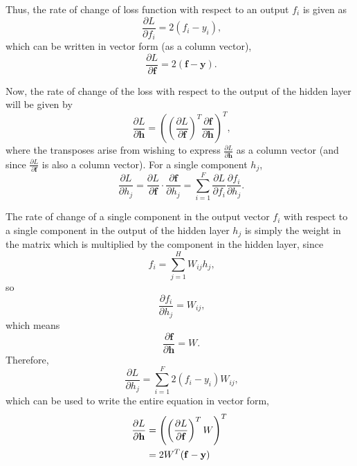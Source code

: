 \documentclass{article}
\begin{document}
Thus, the rate of change of loss function with respect to an output $f_i$ is given as
\begin{equation}
    \phantom{,}\frac{\partial L}{\partial f_i} = 2(f_i - y_i),
\end{equation}
which can be written in vector form (as a column vector),
\begin{equation}
    \phantom{.}\frac{\partial L}{\partial \mathbf{f}} = 2(\mathbf{f} - \mathbf{y}).
\end{equation}

Now, the rate of change of the loss with respect to the output of the hidden layer will be given by
\begin{equation}
    \phantom{,}\frac{\partial L}{\partial \mathbf{h}} = \left(\left(\frac{\partial L}{\partial \mathbf{f}}\right)^T\frac{\partial\mathbf{f}}{\partial \mathbf{h}}\right)^T,
\end{equation}
where the transposes arise from wishing to express $\frac{\partial L}{\partial \mathbf{h}}$ as a column vector (and since $\frac{\partial L}{\partial \mathbf{f}}$ is also a column vector). For a single component $h_j$,
\begin{equation}
    \phantom{.}\frac{\partial L}{\partial h_j} = \frac{\partial L}{\partial \mathbf{f}}\cdot\frac{\partial\mathbf{f}}{\partial h_j} = \displaystyle\sum_{i=1}^F \frac{\partial L}{\partial f_i}\frac{\partial f_i}{\partial h_j}.
\end{equation}

The rate of change of a single component in the output vector $f_i$ with respect to a single component in the output of the hidden layer $h_j$ is simply the weight in the matrix which is multiplied by the component in the hidden layer, since
\begin{equation}
    \phantom{,}f_i = \displaystyle\sum_{j=1}^H W_{ij} h_j,
\end{equation}
so
\begin{equation}
    \phantom{,}\frac{\partial f_i}{\partial h_j} = W_{ij},
\end{equation}
which means
\begin{equation}
    \phantom{.}\frac{\partial \mathbf{f}}{\partial \mathbf{h}} = W.
\end{equation}
Therefore,
\begin{equation}
\label{eq:dL/dh_j}
    \phantom{,}\frac{\partial L}{\partial h_j} = \displaystyle\sum_{i=1}^F 2(f_i - y_i)W_{ij},
\end{equation}
which can be used to write the entire equation in vector form,
\begin{align}
\label{eq:dL/dh}
    \frac{\partial L}{\partial \mathbf{h}} &= \left(\left(\frac{\partial L}{\partial \mathbf{f}}\right)^TW\right)^T\notag \\
    &= 2{W}^T (\mathbf{f} - \mathbf{y})
\end{align}
\end{document}
